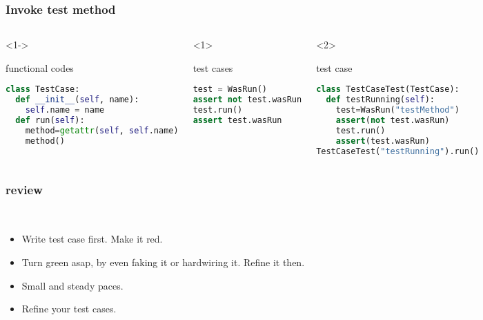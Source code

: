 \documentclass[lualatex]{beamer}
\begin{document}
\begin{frame}[fragile,t]
    \frametitle{Invoke test method}

    \begin{columns}[t]
        \small
        \begin{onlyenv}<1->
            \begin{block}{functional codes}
                \begin{lstlisting}[language=Python,columns=fullflexible]
class TestCase:
  def __init__(self, name):
    self.name = name
  def run(self):
    method=getattr(self, self.name)
    method()
                \end{lstlisting}
            \end{block}
        \end{onlyenv}


        \begin{onlyenv}<1>
            \begin{block}{test cases}
                \begin{lstlisting}[language=Python,columns=fullflexible]
test = WasRun()
assert not test.wasRun
test.run()
assert test.wasRun
                \end{lstlisting}
            \end{block}
        \end{onlyenv}

        \begin{onlyenv}<2>
            \begin{block}{test case}
                \begin{lstlisting}[language=Python,columns=fullflexible]
class TestCaseTest(TestCase):
  def testRunning(self):
    test=WasRun("testMethod")
    assert(not test.wasRun)
    test.run()
    assert(test.wasRun)
TestCaseTest("testRunning").run()
                \end{lstlisting}
            \end{block}
        \end{onlyenv}

    \end{columns}
\end{frame}

\begin{frame}
  \frametitle{review}

  \begin{block}{~}
    \begin{itemize}
    \item 
      Write test case first.
      Make it red.
    \item 
      Turn green asap, by even faking it or hardwiring it.
      Refine it then.
    \item 
      Small and steady paces.
    \item 
      Refine your test cases.
    \end{itemize}
    \end{block}
\end{frame}
\end{document}
